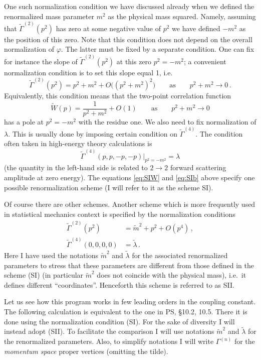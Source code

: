 One such normalization condition we have discussed already when we defined the
renormalized mass parameter $m^2$ as the physical mass squared. Namely,
assuming that $\tilde\Gamma^{(2)}(p^2)$ has zero at some negative value of
$p^2$ we have defined $-m^2$ as the position of this zero. Note that this
condition does not depend on the overall normalization of $\varphi$. The latter
must be fixed by a separate condition. One can fix for instance the slope of
$\tilde\Gamma^{(2)}(p^2)$ at this zero $p^2=-m^2$; a convenient normalization
condition is to set this slope equal 1, i.e.
\begin{equation}\label{eq:SIa}
\tilde\Gamma^{(2)}(p^2)=p^2+m^2+O\bigl((p^2+m^2)^2\bigr)\qquad\text{as}\qquad p^2+m^2\to0\,.
\end{equation}
Equivalently, this condition means that the two-point correlation function
\begin{equation}\label{eq:SIW}
\tilde W(p)=\frac1{p^2+m^2}+O(1)\qquad\text{as}\qquad p^2+m^2\to0
\end{equation}
has a pole at $p^2=-m^2$ with the residue one. We also need to fix
normalization of $\lambda$. This is usually done by imposing certain condition
on $\tilde\Gamma^{(4)}$. The condition often taken in high-energy theory
calculations is
\begin{equation}\label{eq:SIb}
\tilde\Gamma^{(4)}(p,p,-p,-p)\Big|_{p^2=-m^2}=\lambda
\end{equation}
(the quantity in the left-hand side is related to $2\to2$ forward scattering
amplitude at zero energy). The equations \eqref{eq:SIW} and \eqref{eq:SIb} above
specify one possible renormalization scheme (I will refer to it as the scheme
SI).

Of course there are other schemes. Another scheme which is more frequently used
in statistical mechanics context is specified by the normalization conditions
\begin{align}
\tilde\Gamma^{(2)}(p^2)&=\tilde m^2+p^2+O(p^4)\,,\label{eq:SIIa0}\\
\tilde\Gamma^{(4)}(0,0,0,0)&=\tilde\lambda\,.\label{eq:SIIb0}
\end{align}
Here I have used the notations $\tilde m^2$ and $\tilde\lambda$ for the
associated renormalized parameters to stress that these parameters are
different from those defined in the scheme (SI) (in particular $\tilde m^2$
does not coincide with the physical mass), i.e.\ it defines different
``coordinates''. Henceforth this scheme is referred to as SII.

Let us see how this program works in few leading orders in the coupling
constant. The following calculation is equivalent to the one in PS, \S10.2,
10.5. There it is done using the normalization condition (SI). For the sake of
diversity I will instead adopt (SII). To facilitate the comparison I will use
notations $\tilde m^2$ and $\tilde\lambda$ for the renormalized parameters.
Also, to simplify notations I will write $\Gamma^{(n)}$ for the \emph{momentum
space} proper vertices (omitting the tilde).

